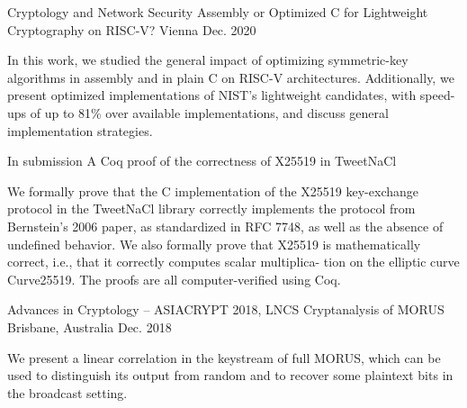 {}


\begin{cventries}
  \cventry
  {Cryptology and Network Security}
  {Assembly or Optimized C for Lightweight Cryptography on RISC-V?} %
  {Vienna} %
  {Dec. 2020} %
  {
    \begin{cvitems} %
      \item {In this work, we studied the general impact of optimizing symmetric-key algorithms in assembly and in plain C on RISC-V architectures. Additionally, we present optimized implementations of NIST's lightweight candidates, with speed-ups of up to 81\% over available implementations, and discuss general implementation strategies.}
    \end{cvitems}
  }

  \cventry
  {In submission}
  {A Coq proof of the correctness of X25519 in TweetNaCl} %
  {} %
  {} %
  {
    \begin{cvitems} %
      \item {We formally prove that the C implementation of the X25519
                  key-exchange protocol in the TweetNaCl library correctly implements the protocol from Bernstein’s 2006 paper, as standardized in RFC 7748, as well
                  as the absence of undefined behavior. We also formally prove that X25519 is mathematically correct, i.e., that it correctly computes scalar multiplica-
                  tion on the elliptic curve Curve25519. The proofs are all computer-verified using Coq.}
    \end{cvitems}
  }

  \vspace{1em}
  \cventry
  {Advances in Cryptology – ASIACRYPT 2018, LNCS}
  {Cryptanalysis of MORUS} %
  {Brisbane, Australia} %
  {Dec. 2018} %
  {
    \begin{cvitems} %
      \item {We present a linear correlation in the keystream of full MORUS, which can be used to distinguish its output from random and to recover some plaintext bits in the broadcast setting.}
    \end{cvitems}
  }


\end{cventries}
